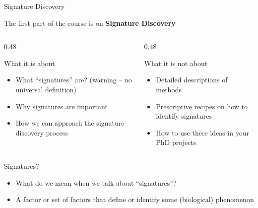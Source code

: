 \documentclass[aspectratio=169]{beamer}
\begin{document}
\begin{frame}{Signature Discovery}

  The first part of the course is on \textbf{Signature Discovery}
  \pause
  \begin{columns}[t]
    \begin{column}{0.48\textwidth}
      \begin{block}{What it is about}
        \begin{itemize}
          \item What ``signatures'' are? (warning -- no universal definition)
          \item Why signatures are important
          \item How we can approach the signature discovery process
        \end{itemize}
      \end{block}
    \end{column}
    \pause
    \begin{column}{0.48\textwidth}
      \begin{block}{What it is not about}
        \begin{itemize}      
          \item Detailed descriptions of methods
          \item Prescriptive recipes on how to identify signatures
          \item How to use these ideas in your PhD projects
        \end{itemize}
      \end{block}
    \end{column}
  \end{columns}
\end{frame}


\begin{frame}{Signatures?}
    \begin{itemize}
        \item What do we mean when we talk about “signatures”? \pause
        \item A factor or set of factors that define or identify some (biological) phenomenon
    \end{itemize}
\end{frame}
\end{document}
